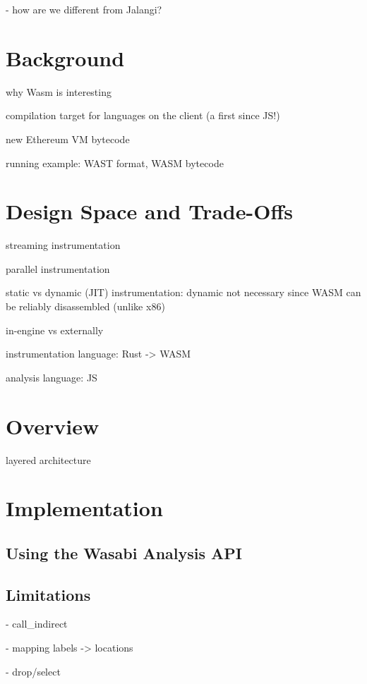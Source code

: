 \documentclass[sigplan,review,anonymous]{acmart}\settopmatter{printfolios=true,printccs=false,printacmref=false}
\newcommand{\name}{Wasabi}
\begin{document}
- how are we different from Jalangi?

\newpage
\section{Background}
\label{sec:background}

why Wasm is interesting

compilation target for languages on the client (a first since JS!)

new Ethereum VM bytecode

running example: WAST format, WASM bytecode

\newpage
\section{Design Space and Trade-Offs}
\label{sec:design}

streaming instrumentation

parallel instrumentation

static vs dynamic (JIT) instrumentation: dynamic not necessary since WASM can be reliably disassembled (unlike x86)

in-engine vs externally

instrumentation language: Rust -> WASM

analysis language: JS

\newpage
\section{Overview}
\label{sec:overview}

layered architecture

\newpage
\section{Implementation}
\label{sec:implementation}

\subsection{Using the \name{} Analysis API}

\subsection{Limitations}
- call\_indirect

- mapping labels -> locations

- drop/select
\end{document}
